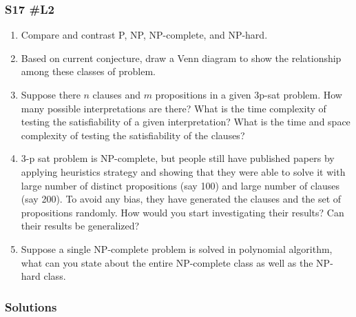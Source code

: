 \subsubsection{S17 \#L2}
\begin{enumerate}[label=\alph*.]
		\item Compare and contrast P, NP, NP-complete, and NP-hard.
		\item Based on current conjecture, draw a Venn diagram to show the relationship among these classes of problem.
		\item Suppose there $n$ clauses and $m$ propositions in a given 3p-sat problem.  How many possible interpretations are there?  What is the time complexity of testing the satisfiability of a given interpretation?  What is the time and space complexity of testing the satisfiability of the clauses?
		\item 3-p sat problem is NP-complete, but people still have published papers by applying heuristics strategy and showing that they were able to solve it with large number of distinct propositions (say 100) and large number of clauses (say 200).  To avoid any bias, they have generated the clauses and the set of propositions randomly.  How would you start investigating their results?  Can their results be generalized?
		\item Suppose a single NP-complete problem is solved in polynomial algorithm, what can you state about the entire NP-complete class as well as the NP-hard class.
\end{enumerate}

\subsubsection{Solutions}

